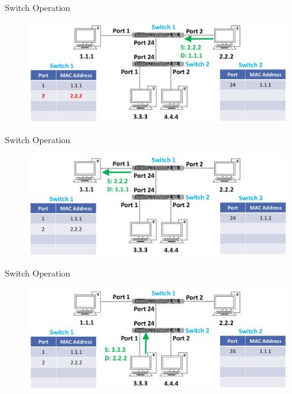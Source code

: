 \documentclass[pdflatex,compress,mathserif]{beamer}
\begin{document}
\begin{frame}{Switch Operation}
	\begin{figure}
		\centering
		\includegraphics[width=\linewidth]{img/img18}
	\end{figure}
\end{frame}

\begin{frame}{Switch Operation}
	\begin{figure}
		\centering
		\includegraphics[width=\linewidth]{img/img19}
	\end{figure}
\end{frame}

\begin{frame}{Switch Operation}
	\begin{figure}
		\centering
		\includegraphics[width=\linewidth]{img/img20}
	\end{figure}
\end{frame}
\end{document}
